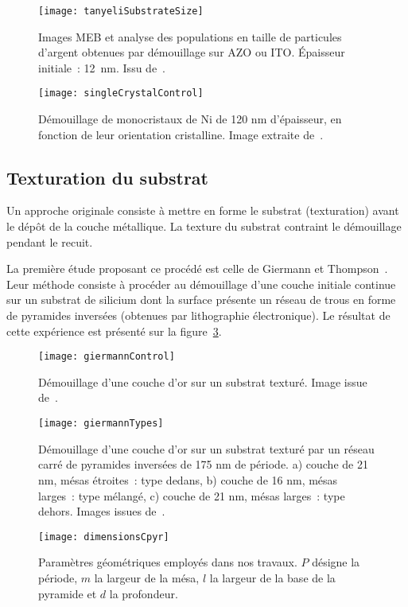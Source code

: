 \begin{figure}[!htb]
	\centering
	\texttt{[image: tanyeliSubstrateSize]}
	\caption{Images MEB et analyse des populations en taille de particules d'argent obtenues par démouillage sur AZO ou ITO. Épaisseur initiale~: 12~nm. Issu de~\cite{tanyeli2013effect}.}
	\label{tanyeliSubstrateSize}
\end{figure} 
\begin{figure}[!htb]
	\centering
	\texttt{[image: singleCrystalControl]}
	\caption{Démouillage de monocristaux de Ni de 120 nm d'épaisseur, en fonction de leur orientation cristalline. Image extraite de~\cite{ye2011templated}.}
	\label{singleCrystalControl}
\end{figure} 

	\subsection{Texturation du substrat}
	\label{sControleBiblio}
Un approche originale consiste à mettre en forme le substrat (texturation) avant le dépôt de la couche métallique. La texture du substrat contraint le démouillage pendant le recuit.\par  
La première étude proposant ce procédé est celle de Giermann et Thompson~\cite{giermann2005solid, giermann2011requirements}. Leur méthode consiste à procéder au démouillage d'une couche initiale continue sur un substrat de silicium dont la surface présente un réseau de trous en forme de pyramides inversées (obtenues par lithographie électronique). Le résultat de cette expérience est présenté sur la figure~\ref{giermannControl}.
\begin{figure}[!htb]
	\centering
	\texttt{[image: giermannControl]}
	\caption{Démouillage d'une couche d'or sur un substrat texturé. Image issue de~\cite{giermann2005solid}.}
	\label{giermannControl}
\end{figure} 
\begin{figure}[!htb]
	\centering
	\texttt{[image: giermannTypes]}
	\caption{Démouillage d'une couche d'or sur un substrat texturé par un réseau carré de pyramides inversées de 175 nm de période. a) couche de 21 nm, mésas étroites~: type \og dedans\fg, b) couche de 16 nm, mésas larges~: type \og mélangé\fg, c) couche de 21 nm, mésas larges~: type \og dehors\fg. Images issues de~\cite{giermann2011requirements}.}
	\label{giermannTypes}
\end{figure} 
\begin{figure}[!htb]
	\centering
	\texttt{[image: dimensionsCpyr]}
	\caption{Paramètres géométriques employés dans nos travaux. $P$ désigne la période, $m$ la largeur de la mésa, $l$ la largeur de la base de la pyramide et $d$ la profondeur.}
	\label{schemaGeometrie}
\end{figure} 
